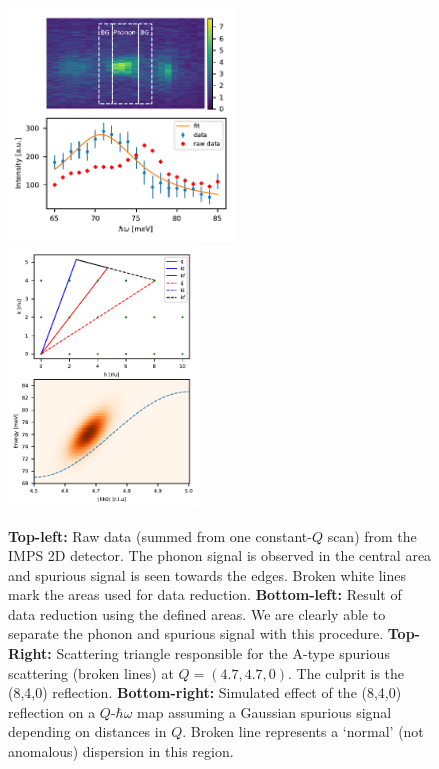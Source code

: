 \begin{figure}
    \centering
    \includegraphics[width=0.54\textwidth]{fig/anomaly/data_reduction.pdf}
    \includegraphics[width=0.45\textwidth]{fig/anomaly/spurion.pdf}
    \caption[IMPS data reduction and Spurion vizualisation]{\textbf{Top-left:} Raw data (summed from one constant-$Q$ scan) from the IMPS 2D detector. The phonon signal is observed in the central area and spurious signal is seen towards the edges. Broken white lines mark the areas used for data reduction. \textbf{Bottom-left:} Result of data reduction using the defined areas. We are clearly able to separate the phonon and spurious signal with this procedure. \textbf{Top-Right:} Scattering triangle responsible for the A-type spurious scattering (broken lines) at $Q=(4.7,4.7,0)$. The culprit is the (8,4,0) reflection. \textbf{Bottom-right:} Simulated effect of the (8,4,0) reflection on a $Q$-$\hbar\omega$ map assuming a Gaussian spurious signal depending on distances in $Q$. Broken line represents a `normal' (not anomalous) dispersion in this region.}
    \label{fig:imps_data_reduction}
\end{figure}

